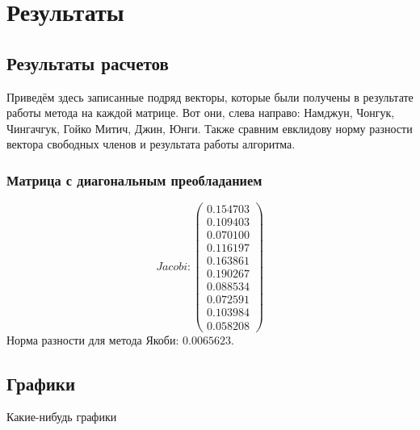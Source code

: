 \documentclass[../../report.tex]{subfiles}
\begin{document}
\chapter{Результаты}

\section{Результаты расчетов}
    Приведём здесь записанные подряд векторы, которые были получены в результате работы метода на каждой матрице. Вот они, слева направо: Намджун, Чонгук, Чингачгук, Гойко Митич, Джин, Юнги.
    Также сравним евклидову норму разности вектора свободных членов и результата работы алгоритма.
\subsection{Матрица с диагональным преобладанием}
\[
    Jacobi:
    \begin{pmatrix}
        0.154703 \\
        0.109403 \\
        0.070100 \\
        0.116197 \\
        0.163861 \\
        0.190267 \\
        0.088534 \\
        0.072591 \\
        0.103984 \\
        0.058208
    \end{pmatrix}
\]
Норма разности для метода Якоби: $0.0065623$.
\section{Графики}
    Какие-нибудь графики
    
\end{document}
